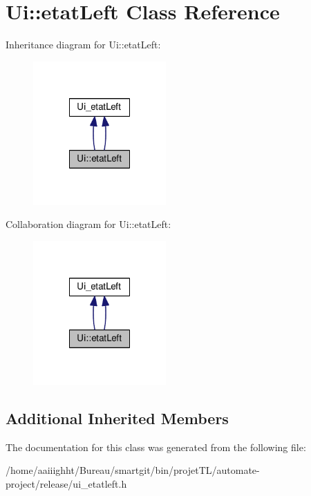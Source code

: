 \hypertarget{class_ui_1_1etat_left}{\section{Ui\-:\-:etat\-Left Class Reference}
\label{class_ui_1_1etat_left}
}


Inheritance diagram for Ui\-:\-:etat\-Left\-:
\nopagebreak
\begin{figure}[H]
\begin{center}
\leavevmode
\includegraphics[width=144pt]{class_ui_1_1etat_left__inherit__graph}
\end{center}
\end{figure}


Collaboration diagram for Ui\-:\-:etat\-Left\-:
\nopagebreak
\begin{figure}[H]
\begin{center}
\leavevmode
\includegraphics[width=144pt]{class_ui_1_1etat_left__coll__graph}
\end{center}
\end{figure}
\subsection*{Additional Inherited Members}


The documentation for this class was generated from the following file\-:\begin{DoxyCompactItemize}
\item 
/home/aaiiighht/\-Bureau/smartgit/bin/projet\-T\-L/automate-\/project/release/ui\-\_\-etatleft.\-h\end{DoxyCompactItemize}
